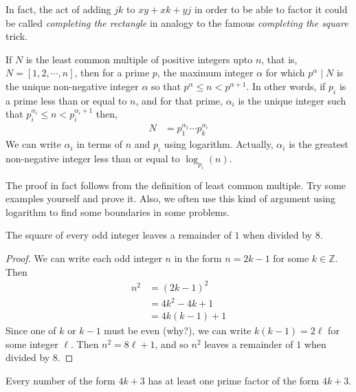In fact, the act of adding ${jk}$ to ${xy}+{xk}+{yj}$ in order to be able to factor it could be called \textit{completing the rectangle} in analogy to the famous \textit{completing the square} trick.
\begin{theorem}\label{thm:lcmfactor}
	If $N$ is the least common multiple of positive integers upto $n$, that is, $N=[1,2,\cdots,n]$, then for a prime $p$, the maximum  integer $\alpha$ for which $p^\alpha\mid N$ is the unique non-negative integer $\alpha$ so that $p^\alpha\leq n<p^{\alpha+1}$. In other words, if $p_i$ is a prime less than or equal to $n$, and for that prime, $\alpha_i$ is the unique integer such that $p_i^{\alpha _i}\leq n<p_i^{\alpha_i+1}$ then,
	\begin{align*}
		N & = p_1^{\alpha _1}\cdots p_k^{\alpha_i}
	\end{align*}\label{thm:lcm}
	We can write $\alpha _i$ in terms of $n$ and $p_i$ using logarithm. Actually, $\alpha_i$ is the greatest non-negative integer less than or equal to $\log_{p_i}(n)$.
\end{theorem}
The proof in fact follows from the definition of least common multiple. Try some examples yourself and prove it. Also, we often use this kind of argument using logarithm to find some boundaries in some problems.

\begin{theorem}
	The square of every odd integer leaves a remainder of $1$ when divided by $8$.
\end{theorem}

\begin{proof}
	We can write each odd integer $n$ in the form $n=2k-1$ for some $k\in\mathbb{Z}$. Then
	\begin{align*}
		n^2
			& = (2k-1)^2\\
			& = 4k^2-4k+1\\
			& = 4k(k-1)+1
	\end{align*}
	Since one of $k$ or $k-1$ must be even (why?), we can write $k(k-1)=2\ell$ for some integer $\ell$. Then $n^2=8\ell+1$, and so $n^2$ leaves a remainder of $1$ when divided by $8$.
\end{proof}

\begin{theorem}\label{thm:4k+3prime}
	Every number of the form $4k+3$ has at least one prime factor of the form $4k+3$.
\end{theorem}

